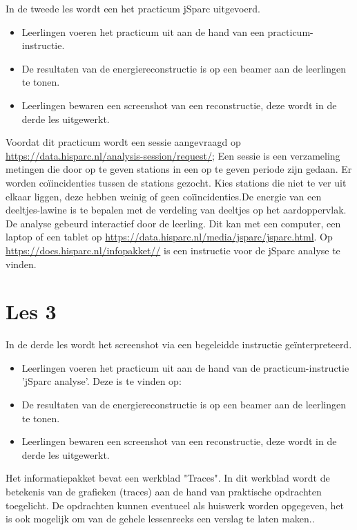 In de tweede les wordt een het practicum jSparc uitgevoerd.

\begin{itemize}
\item Leerlingen voeren het practicum uit aan de hand van een practicum-instructie.
\item De resultaten van de energiereconstructie is op een beamer aan de leerlingen te tonen.
\item Leerlingen bewaren een screenshot van een reconstructie, deze wordt in de derde les uitgewerkt.
\end{itemize}

Voordat dit practicum wordt een sessie aangevraagd op \url{https://data.hisparc.nl/analysis-session/request/}; Een sessie is een verzameling metingen die door op te geven stations in een op te geven periode zijn gedaan. Er worden co\"{i}incidenties tussen de stations gezocht. Kies stations die niet te ver uit elkaar liggen, deze hebben weinig of geen co\"{i}incidenties.De energie van een deeltjes-lawine is te bepalen met de verdeling van deeltjes op het aardoppervlak. De analyse gebeurd interactief door de leerling. Dit kan met een computer, een laptop of een tablet op \url{https://data.hisparc.nl/media/jsparc/jsparc.html}. Op \url{https://docs.hisparc.nl/infopakket//} is een instructie voor de jSparc analyse te vinden.

\section{Les 3}

In de derde les wordt het screenshot via een begeleidde instructie ge\"interpreteerd.
\begin{itemize}
\item Leerlingen voeren het practicum uit aan de hand van de practicum-instructie 'jSparc analyse'. Deze is te vinden op: \url{}
\item De resultaten van de energiereconstructie is op een beamer aan de leerlingen te tonen.
\item Leerlingen bewaren een screenshot van een reconstructie, deze wordt in de derde les uitgewerkt.
\end{itemize}

Het informatiepakket bevat een werkblad "Traces". In dit werkblad wordt de betekenis van de grafieken (traces) aan de hand van praktische opdrachten toegelicht. De opdrachten kunnen eventueel als huiswerk worden opgegeven, het is ook mogelijk om van de gehele lessenreeks een verslag te laten maken..

